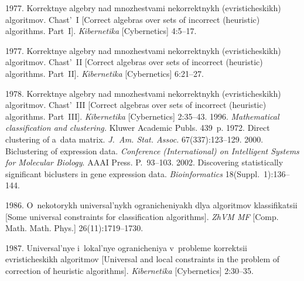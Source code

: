   \begin{multicols}{2}

\renewcommand{\bibname}{\protect\rmfamily References}

{\small\frenchspacing
 {%
 \begin{thebibliography}{99}
 1977. Korrektnye  algebry nad mnozhestvami nekorrektnykh 
(evristicheskikh) algoritmov. Chast'~I 
[Correct algebras over sets of incorrect (heuristic) algorithms. Part~I]. 
\textit{Kibernetika} [Cybernetics] 4:5--17.

 1977. Korrektnye  algebry nad mno\-zhe\-st\-va\-mi nekorrektnykh 
(evristicheskikh) algoritmov. Chast'~II 
[Correct algebras over sets of incorrect (heuristic) algorithms. Part~II]. 
\textit{Kibernetika} [Cybernetics] 6:21--27.

 1978. Korrektnye  algebry nad mno\-zhe\-st\-va\-mi nekorrektnykh 
(evristicheskikh) algoritmov. Chast'~III 
[Correct algebras over sets of incorrect (heuristic) algorithms. Part~III]. 
\textit{Kibernetika} [Cybernetics] 2:35--43.
 1996. 
\textit{Mathematical classification and clustering.} Kluwer Academic Publs. 439~p.
 1972. Direct clustering of a~data matrix. 
\textit{J.~Am. Stat. Assoc.} 67(337):123--129.
 2000. 
Biclustering of expression data. 
\textit{Conference (International) on Intelligent Systems for Molecular Biology}.
 AAAI Press. P.~93--103.
 2002. 
Discovering statistically significant biclusters in gene expression data. 
\textit{Bioinformatics} 18(Suppl.~1):136--144.

 1986. O~nekotorykh universal'nykh ogranicheniyakh dlya 
algoritmov klassifikatsii [Some universal constraints for classification algorithms]. 
\textit{ZhVM MF} [Comp. Math. Math. Phys.] 26(11):1719--1730.

 1987. Universal'nye i~lokal'nye ogranicheniya 
v~probleme korrektsii evristicheskikh algoritmov 
[Universal and local constraints in the problem of correction of 
heuristic algorithms]. \textit{Kibernetika} [Cybernetics] 2:30--35.


\end{thebibliography}}}
\end{multicols}
